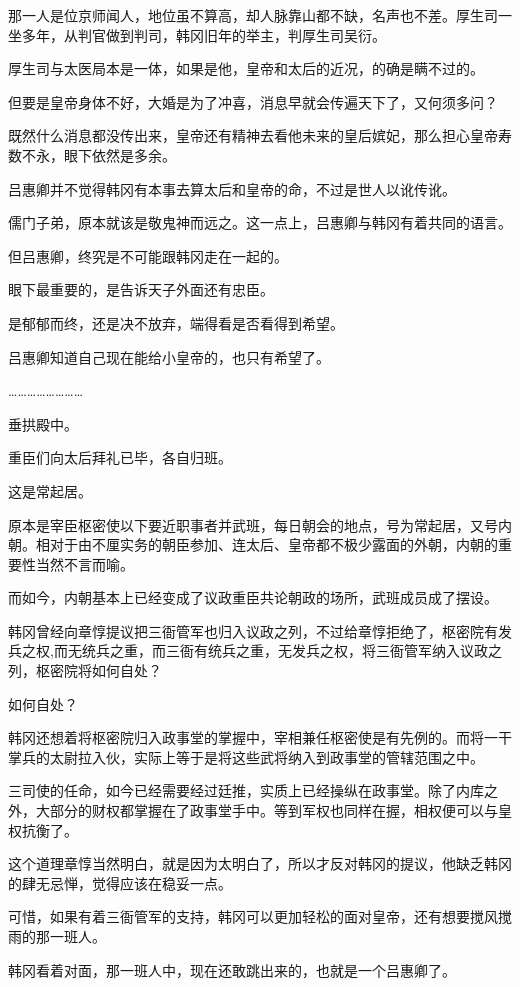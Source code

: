 那一人是位京师闻人，地位虽不算高，却人脉靠山都不缺，名声也不差。厚生司一坐多年，从判官做到判司，韩冈旧年的举主，判厚生司吴衍。

厚生司与太医局本是一体，如果是他，皇帝和太后的近况，的确是瞒不过的。

但要是皇帝身体不好，大婚是为了冲喜，消息早就会传遍天下了，又何须多问？

既然什么消息都没传出来，皇帝还有精神去看他未来的皇后嫔妃，那么担心皇帝寿数不永，眼下依然是多余。

吕惠卿并不觉得韩冈有本事去算太后和皇帝的命，不过是世人以讹传讹。

儒门子弟，原本就该是敬鬼神而远之。这一点上，吕惠卿与韩冈有着共同的语言。

但吕惠卿，终究是不可能跟韩冈走在一起的。

眼下最重要的，是告诉天子外面还有忠臣。

是郁郁而终，还是决不放弃，端得看是否看得到希望。

吕惠卿知道自己现在能给小皇帝的，也只有希望了。

……………………

垂拱殿中。

重臣们向太后拜礼已毕，各自归班。

这是常起居。

原本是宰臣枢密使以下要近职事者并武班，每日朝会的地点，号为常起居，又号内朝。相对于由不厘实务的朝臣参加、连太后、皇帝都不极少露面的外朝，内朝的重要性当然不言而喻。

而如今，内朝基本上已经变成了议政重臣共论朝政的场所，武班成员成了摆设。

韩冈曾经向章惇提议把三衙管军也归入议政之列，不过给章惇拒绝了，枢密院有发兵之权,而无统兵之重，而三衙有统兵之重，无发兵之权，将三衙管军纳入议政之列，枢密院将如何自处？

如何自处？

韩冈还想着将枢密院归入政事堂的掌握中，宰相兼任枢密使是有先例的。而将一干掌兵的太尉拉入伙，实际上等于是将这些武将纳入到政事堂的管辖范围之中。

三司使的任命，如今已经需要经过廷推，实质上已经操纵在政事堂。除了内库之外，大部分的财权都掌握在了政事堂手中。等到军权也同样在握，相权便可以与皇权抗衡了。

这个道理章惇当然明白，就是因为太明白了，所以才反对韩冈的提议，他缺乏韩冈的肆无忌惮，觉得应该在稳妥一点。

可惜，如果有着三衙管军的支持，韩冈可以更加轻松的面对皇帝，还有想要搅风搅雨的那一班人。

韩冈看着对面，那一班人中，现在还敢跳出来的，也就是一个吕惠卿了。

